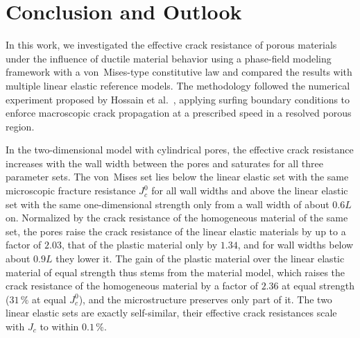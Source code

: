\documentclass[pdflatex,sn-mathphys-num]{sn-jnl}%
\theoremstyle{thmstyleone}%
\theoremstyle{thmstyletwo}%
\theoremstyle{thmstylethree}%
\begin{document}


\section{Conclusion and Outlook}

In this work, we investigated the effective crack resistance of porous materials under the
influence of ductile material behavior using a phase-field modeling framework with a von~Mises-type constitutive law and
compared the results with multiple linear elastic reference models. The methodology followed
the numerical experiment proposed by Hossain et al.~\cite{hossain_effective_2014}, applying
surfing boundary conditions to enforce macroscopic crack propagation at a prescribed speed in a resolved porous region.

In the two-dimensional model with cylindrical pores, the effective crack resistance increases with the wall width between the pores and saturates for all three parameter sets. The von~Mises set lies below the linear elastic set with the same microscopic fracture resistance $J_c^0$ for all wall widths and above the linear elastic set with the same one-dimensional strength only from a wall width of about $0.6L$ on. Normalized by the crack resistance of the homogeneous material of the same set, the pores raise the crack resistance of the linear elastic materials by up to a factor of $2.03$, that of the plastic material only by $1.34$, and for wall widths below about $0.9L$ they lower it. The gain of the plastic material over the linear elastic material of equal strength thus stems from the material model, which raises the crack resistance of the homogeneous material by a factor of $2.36$ at equal strength ($31\,\%$ at equal $J_c^0$), and the microstructure preserves only part of it. The two linear elastic sets are exactly self-similar, their effective crack resistances scale with $J_c$ to within $0.1\,\%$.
\end{document}
